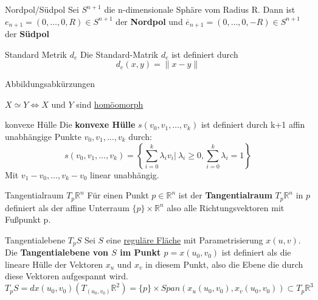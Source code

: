 \begin{titleDef}{Nordpol/Südpol}
\label{pol}
Sei $S^{n+1}$ die n-dimensionale Sphäre vom Radius R. Dann ist $e_{n+1}=(0,\ldots,0,R)\in S^{n+1}$ der \textbf{Nordpol} und $\overline{e}_{n+1}=(0,\ldots,0,-R)\in S^{n+1}$ der \textbf{Südpol}
\end{titleDef}

\begin{titleDef}{Standard Metrik $d_e$}
\label{stdmetrik}
Die Standard-Matrik $d_e$ ist definiert durch 
$$d_e(x,y)=\lVert x-y\rVert$$
\end{titleDef}

\begin{titleDef}{Abbildungsabkürzungen}
\end{titleDef}

\begin{rawDef}
\label{homoemorphshort}
$X\simeq Y \Leftrightarrow X \text{ und } Y$ sind \hyperref[homoemorph]{homöomorph}
\end{rawDef}

\begin{titleDef}{konvexe Hülle}
\label{konvHuelle}
Die \textbf{konvexe Hülle} $s(v_0,v_1,\ldots,v_k)$ ist definiert durch k+1 affin unabhängige Punkte $v_0,v_1,\ldots,v_k$ durch:
$$s(v_0,v_1,\ldots,v_k)=\left\{\sum_{i=0}^{k}\lambda_iv_i |\ \lambda_i\geq0,\sum_{i=0}^{k}\lambda_i=1\right\}$$
Mit $v_1-v_0,\ldots,v_k-v_0$ linear unabhängig.
\end{titleDef}

\begin{titleDef}{Tangentialraum $T_p\mathbb{R}^n$}
\label{tangentialraum}
Für einen Punkt $p\in\mathbb{R}^n$ ist der \textbf{Tangentialraum} $T_p\mathbb{R}^n$ in $p$ definiert als der affine Unterraum $\{p\}\times\mathbb{R}^n$ also alle Richtungsvektoren mit Fußpunkt p.
\end{titleDef}

\begin{titleDef}{Tangentialebene $T_pS$}
\label{tangentialebene}
Sei $S$ eine \hyperref[regFlaeche]{reguläre Fläche} mit Parametrisierung $x(u,v)$. Die \textbf{Tangentialebene von $S$ im Punkt $p=x(u_0,v_0)$} ist definiert als die lineare Hülle der Vektoren $x_u$ und $x_v$ in diesem Punkt, also die Ebene die durch diese Vektoren aufgespannt wird.
$$T_pS=dx(u_0,v_0)(T_{(u_0,v_0)}\mathbb{R}^2)=\{p\}\times Span(x_u(u_0,v_0),x_v(u_0,v_0))\subset T_p\mathbb{R}^3$$ 
\end{titleDef}

